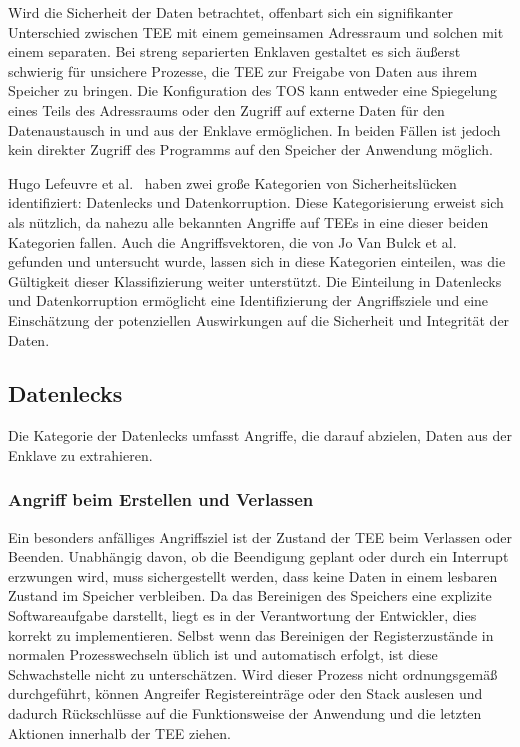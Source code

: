 Wird die Sicherheit der Daten betrachtet, offenbart sich ein signifikanter Unterschied zwischen TEE mit einem gemeinsamen Adressraum und solchen mit einem separaten. 
Bei streng separierten Enklaven gestaltet es sich äußerst schwierig für unsichere Prozesse, die TEE zur Freigabe von Daten aus ihrem Speicher zu bringen.
Die Konfiguration des TOS kann entweder eine Spiegelung eines Teils des Adressraums oder den Zugriff auf externe Daten für den Datenaustausch in und aus der Enklave ermöglichen. 
In beiden Fällen ist jedoch kein direkter Zugriff des Programms auf den Speicher der Anwendung möglich.

Hugo Lefeuvre et al.~\cite{CIVPaper} haben zwei große Kategorien von Sicherheitslücken identifiziert: Datenlecks und Datenkorruption. Diese Kategorisierung erweist sich als nützlich, da nahezu alle bekannten Angriffe auf TEEs in eine dieser beiden Kategorien fallen. Auch die Angriffsvektoren, die von Jo Van Bulck et al.\cite{TEEPaper} gefunden und untersucht wurde, lassen sich in diese Kategorien einteilen, was die Gültigkeit dieser Klassifizierung weiter unterstützt. Die Einteilung in Datenlecks und Datenkorruption ermöglicht eine Identifizierung der Angriffsziele und eine Einschätzung der potenziellen Auswirkungen auf die Sicherheit und Integrität der Daten.

\subsection{Datenlecks}
Die Kategorie der Datenlecks umfasst Angriffe, die darauf abzielen, Daten aus der Enklave zu extrahieren. 

\subsubsection{Angriff beim Erstellen und Verlassen}
Ein besonders anfälliges Angriffsziel ist der Zustand der TEE beim Verlassen oder Beenden. Unabhängig davon, ob die Beendigung geplant oder durch ein Interrupt erzwungen wird, muss sichergestellt werden, dass keine Daten in einem lesbaren Zustand im Speicher verbleiben. Da das Bereinigen des Speichers eine explizite Softwareaufgabe darstellt, liegt es in der Verantwortung der Entwickler, dies korrekt zu implementieren. Selbst wenn das Bereinigen der Registerzustände in normalen Prozesswechseln üblich ist und automatisch erfolgt, ist diese Schwachstelle nicht zu unterschätzen. Wird dieser Prozess nicht ordnungsgemäß durchgeführt, können Angreifer Registereinträge oder den Stack auslesen und dadurch Rückschlüsse auf die Funktionsweise der Anwendung und die letzten Aktionen innerhalb der TEE ziehen.

